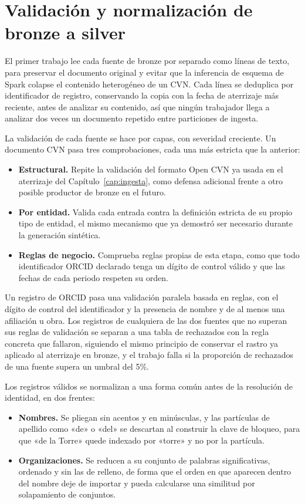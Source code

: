 \section{Validación y normalización de bronze a silver}
\label{sec:procesamiento_silver}

El primer trabajo lee cada fuente de bronze por separado como líneas de
texto, para preservar el documento original y evitar que la inferencia de
esquema de Spark colapse el contenido heterogéneo de un CVN. Cada línea
se deduplica por identificador de registro, conservando la copia con la
fecha de aterrizaje más reciente, antes de analizar su contenido, así que
ningún trabajador llega a analizar dos veces un documento repetido entre
particiones de ingesta.

La validación de cada fuente se hace por capas, con severidad creciente.
Un documento CVN pasa tres comprobaciones, cada una más estricta que la
anterior:

\begin{itemize}
  \item \textbf{Estructural.} Repite la validación del formato Open CVN ya
  usada en el aterrizaje del Capítulo~\ref{cap:ingesta}, como defensa
  adicional frente a otro posible productor de bronze en el futuro.
  \item \textbf{Por entidad.} Valida cada entrada contra la definición
  estricta de su propio tipo de entidad, el mismo mecanismo que ya
  demostró ser necesario durante la generación sintética.
  \item \textbf{Reglas de negocio.} Comprueba reglas propias de esta
  etapa, como que todo identificador ORCID declarado tenga un dígito de
  control válido y que las fechas de cada periodo respeten su orden.
\end{itemize}

Un registro de ORCID pasa una validación paralela basada en reglas, con el
dígito de control del identificador y la presencia de nombre y de al
menos una afiliación u obra. Los registros de cualquiera de las dos
fuentes que no superan sus reglas de validación se separan a una tabla de
rechazados con la regla concreta que fallaron,
siguiendo el mismo principio de conservar el rastro ya aplicado al
aterrizaje en bronze, y el trabajo falla si la proporción de rechazados de
una fuente supera un umbral del 5\%.

Los registros válidos se normalizan a una forma común antes de la
resolución de identidad, en dos frentes:

\begin{itemize}
  \item \textbf{Nombres.} Se pliegan sin acentos y en minúsculas, y las
  partículas de apellido como «de» o «del» se descartan al construir la
  clave de bloqueo, para que «de la Torre» quede indexado por «torre» y no
  por la partícula.
  \item \textbf{Organizaciones.} Se reducen a su conjunto de palabras
  significativas, ordenado y sin las de relleno, de forma que el orden en
  que aparecen dentro del nombre deje de importar y pueda calcularse una
  similitud por solapamiento de conjuntos.
\end{itemize}

